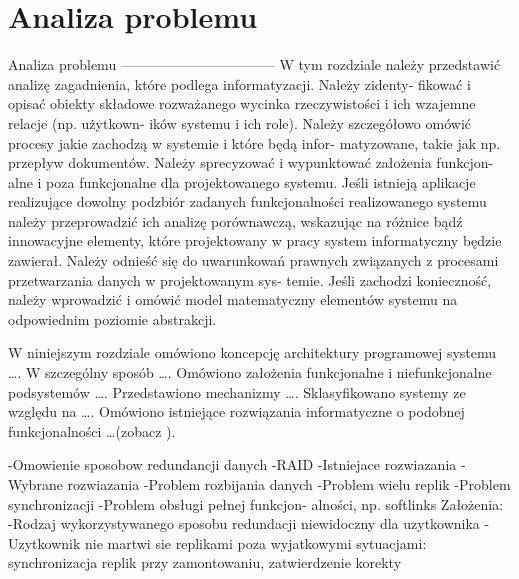 \chapter{Analiza problemu}
\thispagestyle{chapterBeginStyle}
\label{rozdzial1}

Analiza problemu
---------------------------------
W tym rozdziale należy przedstawić analizę zagadnienia, które podlega informatyzacji. Należy zidenty-
fikować i opisać obiekty składowe rozważanego wycinka rzeczywistości i ich wzajemne relacje (np. użytkown-
ików systemu i ich role). Należy szczegółowo omówić procesy jakie zachodzą w systemie i które będą infor-
matyzowane, takie jak np. przepływ dokumentów. Należy sprecyzować i wypunktować założenia funkcjon-
alne i poza funkcjonalne dla projektowanego systemu. Jeśli istnieją aplikacje realizujące dowolny podzbiór
zadanych funkcjonalności realizowanego systemu należy przeprowadzić ich analizę porównawczą, wskazując na
różnice bądź innowacyjne elementy, które projektowany w pracy system informatyczny będzie zawierał. Należy
odnieść się do uwarunkowań prawnych związanych z procesami przetwarzania danych w projektowanym sys-
temie. Jeśli zachodzi konieczność, należy wprowadzić i omówić model matematyczny elementów systemu na
odpowiednim poziomie abstrakcji.
{\color{dgray}
W niniejszym rozdziale omówiono koncepcję architektury programowej systemu \ldots. W
szczególny sposób \ldots. Omówiono założenia funkcjonalne i niefunkcjonalne podsystemów \ldots. Przedstawiono
mechanizmy \ldots. Sklasyfikowano systemy ze względu na \ldots. Omówiono istniejące rozwiązania informatyczne o podobnej funkcjonalności \ldots (zobacz \cite{JCINodesChord}).

-Omowienie sposobow redundancji danych -RAID -Istniejace rozwiazania -Wybrane rozwiazania
-Problem rozbijania danych -Problem wielu replik -Problem synchronizacji -Problem obsługi pełnej funkcjon-
alności, np. softlinks
Założenia: -Rodzaj wykorzystywanego sposobu redundacji niewidoczny dla uzytkownika -Uzytkownik nie
martwi sie replikami poza wyjatkowymi sytuacjami: synchronizacja replik przy zamontowaniu, zatwierdzenie
korekty
}

